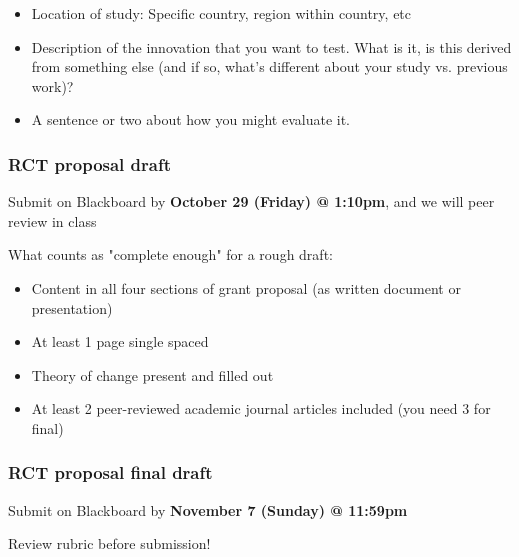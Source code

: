 \documentclass[11pt]{article}
\begin{document}
\begin{itemize} 
\item Location of study: Specific country, region within country, etc 
\item Description of the innovation that you want to test. What is it, is this derived from something else (and if so, what's different about your study vs. previous work)?
\item A sentence or two about how you might evaluate it. 
\end{itemize} 




\subsubsection*{RCT proposal draft}

Submit on Blackboard by \textbf{October 29 (Friday) @ 1:10pm}, and we will peer review in class 

What counts as "complete enough" for a rough draft:
\begin{itemize} 
\item Content in all four sections of grant proposal (as written document or presentation)
\item At least 1 page single spaced 
\item Theory of change present and filled out 
\item At least 2 peer-reviewed academic journal articles included (you need 3 for final)

  
\end{itemize} 


\subsubsection*{RCT proposal final draft}

 Submit on Blackboard by \textbf{November 7 (Sunday) @ 11:59pm}

Review rubric before submission!
\end{document}
